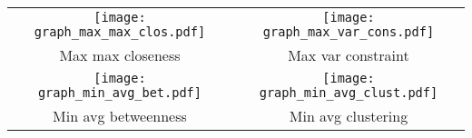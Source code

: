 \documentclass{standalone}
\begin{document}
\begin{tabular}{cc}
\texttt{[image: graph\_max\_max\_clos.pdf]} & \texttt{[image: graph\_max\_var\_cons.pdf]}\\
  Max max closeness & Max var constraint\\[1em]
\texttt{[image: graph\_min\_avg\_bet.pdf]} & \texttt{[image: graph\_min\_avg\_clust.pdf]}\\
Min avg betweenness & Min avg clustering\\
\end{tabular}
\end{document}

